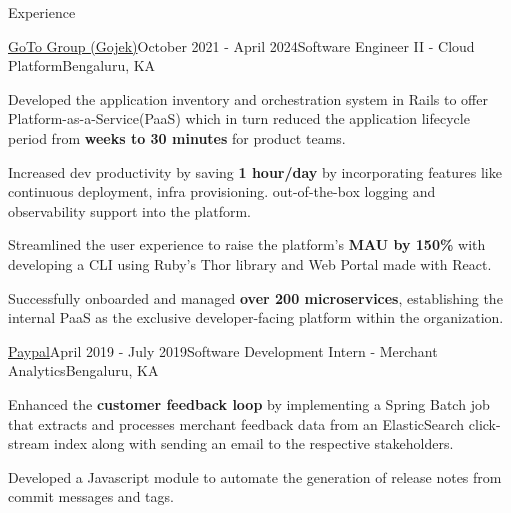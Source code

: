 \documentclass[
	11pt, %
]{resume} %
\begin{document}
\begin{rSection}{Experience}
	
 \begin{rSubsection}{\href{https://www.gotocompany.com/en/about-us}{GoTo Group (Gojek)}}{October 2021 - April 2024}{Software Engineer II - Cloud Platform}{Bengaluru, KA}
	\item Developed the application inventory and orchestration system in Rails to offer Platform-as-a-Service(PaaS) which in turn reduced the application lifecycle period from \textbf{weeks to 30 minutes} for product teams.
		\item Increased dev productivity by saving \textbf{1 hour/day} by incorporating features like continuous deployment, infra provisioning. out-of-the-box logging and observability support into the platform.
          \item Streamlined the user experience to raise the platform's \textbf{MAU by 150\%} with developing a CLI using Ruby's Thor library and Web Portal made with React.
		\item Successfully onboarded and managed \textbf{over 200 microservices}, establishing the internal PaaS as the exclusive developer-facing platform within the organization.
\end{rSubsection}	


	\begin{rSubsection}{\href{https://www.paypal.com/in/home}{Paypal}}{April 2019 - July 2019}{Software Development Intern - Merchant Analytics}{Bengaluru, KA}
		\item Enhanced the \textbf{customer feedback loop} by implementing a Spring Batch job that extracts and processes merchant feedback data from an ElasticSearch click-stream index along with sending an email to the respective stakeholders.
          \item Developed a Javascript module to automate the generation of release notes from commit messages and tags.
	\end{rSubsection}

\end{rSection}

\end{document}
